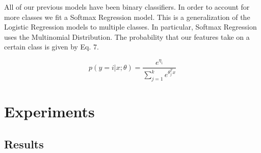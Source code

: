\documentclass[conference]{IEEEtran}
\begin{document}
All of our previous models have been binary classifiers. In order to account for more classes we fit a Softmax Regression model. This is a generalization of the Logistic Regression models to multiple classes. In particular, Softmax Regression uses the Multinomial Distribution. The probability that our features take on a certain class is given by Eq. 7.

\begin{equation}
p(y = i | x;\theta) = \frac{e^{\eta_i}}{\sum_{j=1}^{k} e^{\theta_j^Tx}}
\end{equation}

\section{Experiments}

\subsection{Results}
\end{document}
